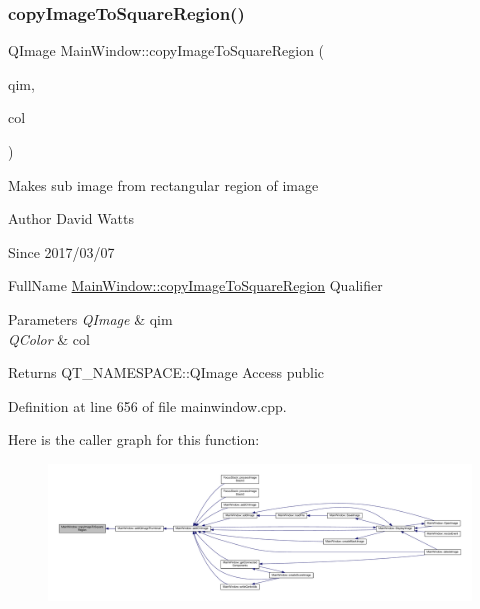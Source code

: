 \subsubsection{\texorpdfstring{copy\+Image\+To\+Square\+Region()}{copyImageToSquareRegion()}}
{\footnotesize\ttfamily Q\+Image Main\+Window\+::copy\+Image\+To\+Square\+Region (\begin{DoxyParamCaption}\item[{Q\+Image}]{qim,  }\item[{Q\+Color}]{col }\end{DoxyParamCaption})}

Makes sub image from rectangular region of image

\begin{DoxyAuthor}{Author}
David Watts 
\end{DoxyAuthor}
\begin{DoxySince}{Since}
2017/03/07
\end{DoxySince}
Full\+Name \hyperlink{class_main_window_a5e034c81127e2a14248eb81414e1e96e}{Main\+Window\+::copy\+Image\+To\+Square\+Region} Qualifier 
\begin{DoxyParams}{Parameters}
{\em Q\+Image} & qim \\
\hline
{\em Q\+Color} & col \\
\hline
\end{DoxyParams}
\begin{DoxyReturn}{Returns}
Q\+T\+\_\+\+N\+A\+M\+E\+S\+P\+A\+C\+E\+::\+Q\+Image Access public 
\end{DoxyReturn}


Definition at line 656 of file mainwindow.\+cpp.

Here is the caller graph for this function\+:
\nopagebreak
\begin{figure}[H]
\begin{center}
\leavevmode
\includegraphics[width=350pt]{class_main_window_a5e034c81127e2a14248eb81414e1e96e_icgraph}
\end{center}
\end{figure}
\mbox{\label{class_main_window_a92a40847027eaf2cf258c3a9f8da4c48}} 
